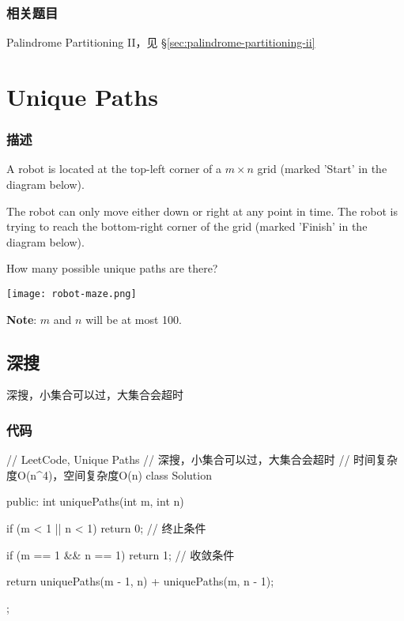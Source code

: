 \subsubsection{相关题目}

\begindot
\item Palindrome Partitioning II，见 \S \ref{sec:palindrome-partitioning-ii}
\myenddot


\section{Unique Paths} %
\label{sec:unique-paths}


\subsubsection{描述}
A robot is located at the top-left corner of a $m \times n$ grid (marked 'Start' in the diagram below).

The robot can only move either down or right at any point in time. The robot is trying to reach the bottom-right corner of the grid (marked 'Finish' in the diagram below).

How many possible unique paths are there?

\begin{center}
\texttt{[image: robot-maze.png]}\\
\label{fig:unique-paths}
\end{center}

\textbf{Note}: $m$ and $n$ will be at most 100.


\subsection{深搜}
深搜，小集合可以过，大集合会超时

\subsubsection{代码}
\begin{Code}
// LeetCode, Unique Paths
// 深搜，小集合可以过，大集合会超时
// 时间复杂度O(n^4)，空间复杂度O(n)
class Solution {
public:
    int uniquePaths(int m, int n) {
        if (m < 1 || n < 1) return 0; // 终止条件

        if (m == 1 && n == 1) return 1; // 收敛条件

        return uniquePaths(m - 1, n) + uniquePaths(m, n - 1);
    }
};
\end{Code}


